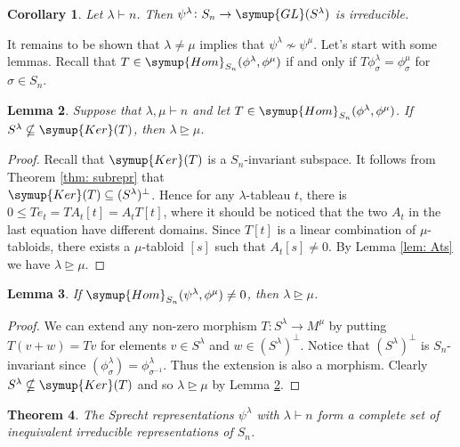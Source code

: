 \documentclass{assignment}[2019/10/15]
\theoremstyle{plain}
\newtheorem{theorem}{Theorem}[section]
\newtheorem{lemma}[theorem]{Lemma}
\newtheorem{corollary}[theorem]{Corollary}
\newcommand{\Kernal}{\mathop{}\!\symup{Ker}}
\newcommand{\Hom}{\mathop{}\!\symup{Hom}}
\newcommand{\GL}{\mathop{}\!\symup{GL}}
\begin{document}
    \begin{corollary}
        Let $\lambda\vdash n$. Then $\psi^\lambda\colon S_n\to \GL(S^\lambda)$ is irreducible.
    \end{corollary}

    It remains to be shown that $\lambda\neq\mu$ implies that $\psi^\lambda\nsim\psi^\mu$. Let's start with some lemmas. Recall that $T\in \Hom_{S_n}(\phi^\lambda, \phi^\mu)$ if and only if $T\phi^\lambda_\sigma = \phi^\mu_\sigma$ for $\sigma\in S_n$.

    \begin{lemma}\label{lem: T-hom}
        Suppose that $\lambda, \mu\vdash n$ and let $T\in \Hom_{S_n}(\phi^\lambda, \phi^\mu)$. If $S^\lambda\nsubseteq \Kernal(T)$, then $\lambda\unrhd \mu$.
    \end{lemma}

    \begin{proof}
        Recall that $\Kernal(T)$ is a $S_n$-invariant subspace. It follows from Theorem \ref{thm: subrepr} that\\ $\Kernal(T)\subseteq(S^\lambda)^\perp$. Hence for any $\lambda$-tableau $t$, there is $0\leq Te_t = TA_t[t]=A_tT[t]$, where it should be noticed that the two $A_t$ in the last equation have different domains. Since $T[t]$ is a linear combination of $\mu$-tabloids, there exists a $\mu$-tabloid $[s]$ such that $A_t[s]\neq 0$. By Lemma \ref{lem: Ats} we have $\lambda\unrhd\mu$.
    \end{proof}

    \begin{lemma}\label{lem: hom-ker}
        If $\Hom_{S_n}(\psi^\lambda, \phi^\mu)\neq 0$, then $\lambda\unrhd \mu$.
    \end{lemma}

    \begin{proof}
        We can extend any non-zero morphism $T\colon S^\lambda\to M^\mu$ by putting $T(v+w)=Tv$ for elements $v\in S^\lambda$ and $w\in (S^\lambda)^\perp$. Notice that $(S^\lambda)^\perp$ is $S_n$-invariant since $(\phi_\sigma^\lambda)=\phi_{\sigma^{-1}}^\lambda$. Thus the extension is also a morphism. Clearly $S^\lambda\nsubseteq\Kernal(T)$ and so $\lambda\unrhd\mu$ by Lemma \ref{lem: T-hom}.
    \end{proof}

    \begin{theorem}
        The Sprecht representations $\psi^\lambda$ with $\lambda\vdash n$ form a complete set of inequivalent irreducible representations of $S_n$.
    \end{theorem}
\end{document}

